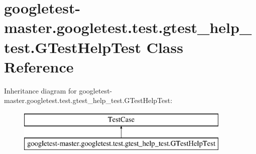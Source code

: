\hypertarget{classgoogletest-master_1_1googletest_1_1test_1_1gtest__help__test_1_1_g_test_help_test}{}\section{googletest-\/master.googletest.\+test.\+gtest\+\_\+help\+\_\+test.\+G\+Test\+Help\+Test Class Reference}
\label{classgoogletest-master_1_1googletest_1_1test_1_1gtest__help__test_1_1_g_test_help_test}
Inheritance diagram for googletest-\/master.googletest.\+test.\+gtest\+\_\+help\+\_\+test.\+G\+Test\+Help\+Test\+:\begin{figure}[H]
\begin{center}
\leavevmode
\includegraphics[height=2.000000cm]{df/def/classgoogletest-master_1_1googletest_1_1test_1_1gtest__help__test_1_1_g_test_help_test}
\end{center}
\end{figure}
